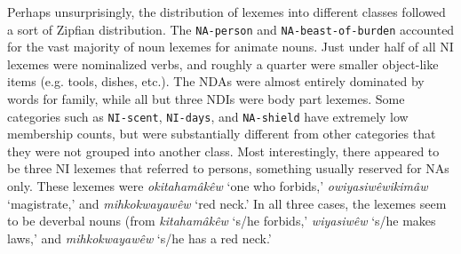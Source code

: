  Perhaps unsurprisingly, the distribution of lexemes into different classes followed a sort of Zipfian distribution. The \texttt{NA-person} and \texttt{NA-beast-of-burden} accounted for the vast majority of noun lexemes for animate nouns. Just under half of all NI lexemes were nominalized verbs, and roughly a quarter were smaller object-like items (e.g. tools, dishes, etc.). The NDAs were almost entirely dominated by words for family, while all but three NDIs were body part lexemes. Some categories such as \texttt{NI-scent}, \texttt{NI-days}, and \texttt{NA-shield} have extremely low membership counts, but were substantially different from other categories that they were not grouped into another class. Most interestingly, there appeared to be three NI lexemes that referred to persons, something usually reserved for NAs only. These lexemes were \textit{okitahamâkêw} ‘one who forbids,’ \textit{owiyasiwêwikimâw} ‘magistrate,’ and \textit{mihkokwayawêw} ‘red neck.’ In all three cases, the lexemes seem to be deverbal nouns (from \textit{kitahamâkêw} ‘s/he forbids,’ \textit{wiyasiwêw} ‘s/he makes laws,’ and \textit{mihkokwayawêw} ‘s/he has a red neck.’


